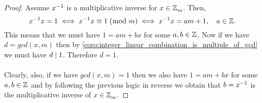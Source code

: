 \documentclass[MathsNotesBase.tex]{subfiles}
\begin{document}
{			
			\begin{proof}
				Assume ${ {x}^{-1} }$ is a multiplicative inverse for ${ x \in \mathbb{Z}^{}_m }$. Then,
				\[ {x}^{-1}x = 1 \iff {x}^{-1}x \equiv 1 \;(\bmod\; m) \iff {x}^{-1}{x} = am + 1, \hspace{10pt} a \in \mathbb{Z}^{}. \]
				This means that we must have ${ 1 = am + bx }$ for some ${ a,b \in \mathbb{Z}^{} }$. Now if we have ${ d = gcd(x,m) }$ then by \autoref{coro:integer_linear_combination_is_multiple_of_gcd} we must have ${ d \mid 1 }$. Therefore ${ d = 1 }$.\\\\
				Clearly, also, if we have ${ gcd(x,m) = 1 }$ then we also have ${ 1 = am + bx }$ for some ${ a,b \in \mathbb{Z}^{} }$ and by following the previous logic in reverse we obtain that ${ b = {x}^{-1} }$ is the multiplicative inverse of ${ x \in \mathbb{Z}^{}_m }$.
			\end{proof}
		}
		
		
	
\end{document}
